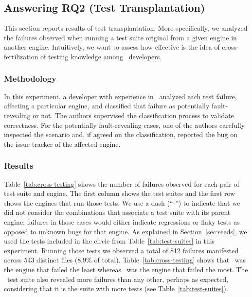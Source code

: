 \documentclass[sigconf,review, anonymous]{acmart}
\begin{document}
\subsection{Answering RQ2 (Test Transplantation)}
\label{sec:transplantation}

This section reports results of test transplantation. More
specifically, we analyzed the failures observed when running a test
suite original from a given engine in another engine. Intuitively, we
want to assess how effective is the idea of cross-fertilization of
testing knowledge among \js\ developers.

\subsubsection{Methodology}
\label{sec:methodology}
In this experiment, a developer with experience in \js\ analyzed each
test failure, affecting a particular engine, and classified that
failure as potentially fault-revealing or not. The authors supervised
the classification process to validate correctness. For the
potentially fault-revealing cases, one of the authors carefully
inspected the scenario and, if agreed on the classification, reported
the bug on the issue tracker of the affected engine.


\subsubsection{Results}
\label{sec:results}


Table~\ref{tab:cross-testing} shows the number of failures observed
for each pair of test suite and engine. The first column shows the
test suites and the first row shows the engines that run those
tests. We use a dash (``-'') to indicate that we did not consider the
combinations that associate a test suite with its parent engine;
failures in those cases would either indicate regressions or flaky
tests as opposed to unknown bugs for that engine. As explained in
Section~\ref{sec:seeds}, we used the
\totalTestFilesForTestTransplantation{} tests included in the circle
from Table~\ref{tab:test-suites} in this experiment. Running those
tests we observed a total of 812 failures manifested across 543
distinct files (8.9\% of total). Table~\ref{tab:cross-testing} shows
that \smonkey\ was the engine that failed the least whereas
\chakra\ was the engine that failed the most. The \smonkey\ test suite
also revealed more failures than any other, perhaps as expected,
considering that it is the suite with more tests (see
Table~\ref{tab:test-suites}).
\end{document}
